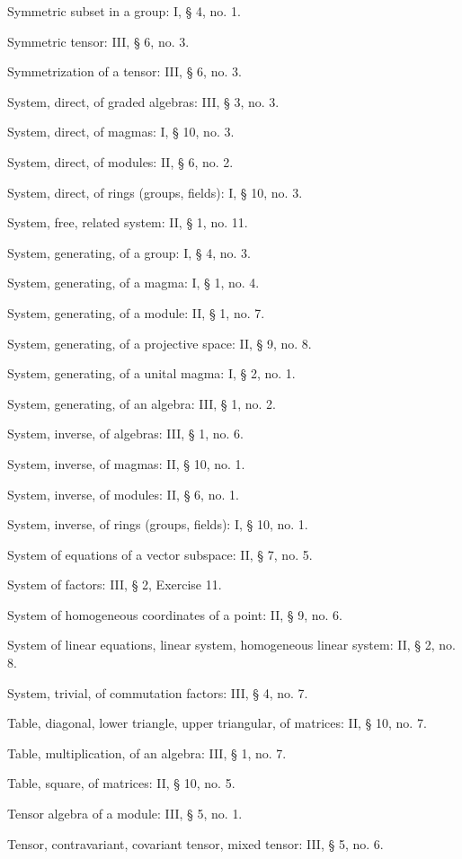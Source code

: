 Symmetric subset in a group: I, § 4, no. 1.

Symmetric tensor: III, § 6, no. 3.

Symmetrization of a tensor: III, § 6, no. 3.

System, direct, of graded algebras: III, § 3, no. 3.

System, direct, of magmas: I, § 10, no. 3.

System, direct, of modules: II, § 6, no. 2.

System, direct, of rings (groups, fields): I, § 10, no. 3.

System, free, related system: II, § 1, no. 11.

System, generating, of a group: I, § 4, no. 3.

System, generating, of a magma: I, § 1, no. 4.

System, generating, of a module: II, § 1, no. 7.

System, generating, of a projective space: II, § 9, no. 8.

System, generating, of a unital magma: I, § 2, no. 1.

System, generating, of an algebra: III, § 1, no. 2.

System, inverse, of algebras: III, § 1, no. 6.

System, inverse, of magmas: II, § 10, no. 1.

System, inverse, of modules: II, § 6, no. 1.

System, inverse, of rings (groups, fields): I, § 10, no. 1.

System of equations of a vector subspace: II, § 7, no. 5.

System of factors: III, § 2, Exercise 11.

System of homogeneous coordinates of a point: II, § 9, no. 6.

System of linear equations, linear system, homogeneous linear system: II, § 2, no. 8.

System, trivial, of commutation factors: III, § 4, no. 7.

Table, diagonal, lower triangle, upper triangular, of matrices: II, § 10, no. 7.

Table, multiplication, of an algebra: III, § 1, no. 7.

Table, square, of matrices: II, § 10, no. 5.

Tensor algebra of a module: III, § 5, no. 1.

Tensor, contravariant, covariant tensor, mixed tensor: III, § 5, no. 6.

